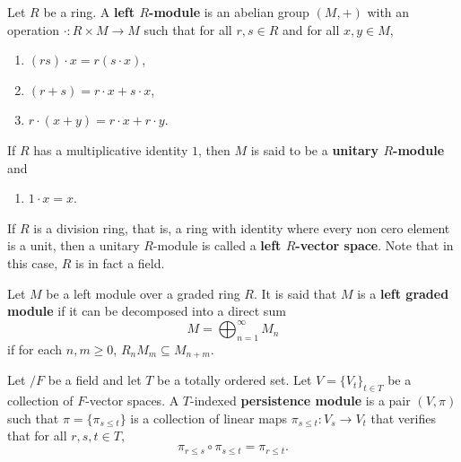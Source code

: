 \begin{definition}
    Let $ R $ be a ring. A {\bf left $R$-module } is an abelian group $ (M, +) $ with an operation $ \cdot \colon R \times M \to M $ such that for all $ r, s \in R $ and for all $ x, y \in M $,
    \begin{enumerate}
    \renewcommand{\labelenumi}{(\roman{enumi})}
        \item $ (rs) \cdot x = r (s \cdot x) $,
        \item $ (r + s) = r \cdot x + s \cdot x $,
        \item $ r \cdot (x + y) = r \cdot x + r \cdot y $.
    \end{enumerate}
    If $ R $ has a multiplicative identity $ 1 $, then $ M $ is said to be a {\bf unitary $R$-module} and 
    \begin{enumerate}
    \renewcommand{\labelenumi}{(\roman{enumi})}
        \setcounter{enumi}{3}
        \item $1 \cdot x = x $.
    \end{enumerate}
    If $ R $ is a division ring, that is, a ring with identity where every non cero element is a unit, then 
    a unitary $R$-module is called a {\bf left $R$-vector space}. Note that in this case, $R$ is in fact a field.
\end{definition}

\begin{definition}
    Let $M$ be a left module over a graded ring $ R $. It is said that $ M $ is a {\bf left graded module} if it can be decomposed into a direct sum
    $$
        M = \bigoplus_{n=1}^{\infty} M_n
    $$
    if for each $n, m \geq 0 $, $ R_n M_m \subseteq M_{n+m} $.
\end{definition}

\begin{definition}
    Let $/F$ be a field and let $T$ be a totally ordered set. Let $ V = \{V_t\}_{t \in T} $ be a collection of $F$-vector spaces. A $T$-indexed {\bf persistence module} is a pair $ (V, \pi) $ such that $ \pi = \{ \pi_{s \leq t} \} $ is a collection of linear maps $ \pi_{s \leq t}\colon V_s \rightarrow V_t $ that verifies that for all $ r, s, t \in T $,
    \begin{equation}
        \pi_{r \leq s} \circ \pi_{s \leq t} = \pi_{r \leq t}.
    \end{equation}
\end{definition}

